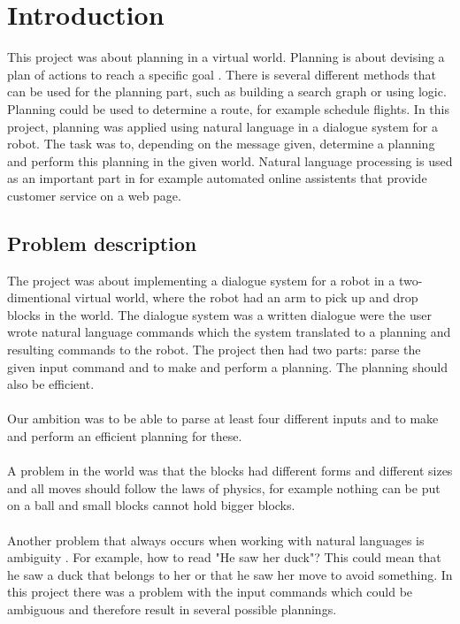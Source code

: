 \chapter{Introduction}
This project was about planning in a virtual world. Planning is about devising a plan of actions to reach a specific goal \citep{planning_ai}. There is several different methods that can be used for the planning part, such as building a search graph or using logic. 
Planning could be used to determine a route, for example schedule flights. In this project, planning was applied using natural language in a dialogue system for a robot. The task was to, depending on the message given, determine a planning and perform this planning in the given world. Natural language processing is used as an important part in for example automated online assistents that provide customer service on a web page. 

\section{Problem description}
The project was about implementing a dialogue system for a robot in a two-dimentional virtual world, where the robot had an arm to pick up and drop blocks in the world. The dialogue system was a written dialogue were the user wrote natural language commands which the system translated to a planning and resulting commands to the robot. The project then had two parts: parse the given input command and to make and perform a planning. The planning should also be efficient. \\\\
Our ambition was to be able to parse at least four different inputs and to make and perform an efficient planning for these. 
\\\\
A problem in the world was that the blocks had different forms and different sizes and all moves should follow the laws of physics, for example nothing can be put on a ball and small blocks cannot hold bigger blocks. \\\\
Another problem that always occurs when working with natural languages is ambiguity \citep{naturallang_ai}. For example, how to read "He saw her duck"? This could mean that he saw a duck that belongs to her or that he saw her move to avoid something. In this project there was a problem with the input commands which could be ambiguous and therefore result in several possible plannings. 

